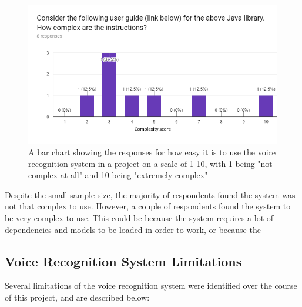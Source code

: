 \documentclass[11pt]{article}
\begin{document}
\begin{center}
\begin{figure}[H]
\begin{center}
  \includegraphics[width=\linewidth]{survey-ease}
  \caption{A bar chart showing the responses for how easy it is to use the voice recognition system in a project on a scale of 1-10, with 1 being "not complex at all" and 10 being "extremely complex"}
  \label{fig:survey-ease}
  \end{center}
\end{figure}
\end{center}

Despite the small sample size, the majority of respondents found the system was not that complex to use. However, a couple of respondents found the system to be very complex to use. This could be because the system requires a lot of dependencies and models to be loaded in order to work, or because the

\subsection{Voice Recognition System Limitations}

Several limitations of the voice recognition system were identified over the course of this project, and are described below:
\end{document}
